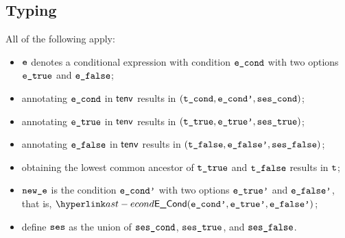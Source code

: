 \subsection{Typing}
\ProseParagraph
All of the following apply:
\begin{itemize}
  \item $\ve$ denotes a conditional expression with condition $\econd$ with two options $\etrue$ and $\efalse$;
  \item annotating $\econd$ in $\tenv$ results in $(\tcond, \econdp, \vsescond)$\ProseOrTypeError;
  \item annotating $\etrue$ in $\tenv$ results in $(\ttrue, \etruep, \vsestrue)$\ProseOrTypeError;
  \item annotating $\efalse$ in $\tenv$ results in $(\tfalse, \efalsep, \vsesfalse)$;
  \item obtaining the lowest common ancestor of $\ttrue$ and $\tfalse$ results in $\vt$\ProseOrTypeError;
  \item $\newe$ is the condition $\econdp$ with two options $\etruep$ and $\efalsep$, that is, $\ECond(\econdp, \etruep, \efalsep)$;
  \item define $\vses$ as the union of $\vsescond$, $\vsestrue$, and $\vsesfalse$.
\end{itemize}
\FormallyParagraph
\begin{mathpar}
\end{mathpar}

